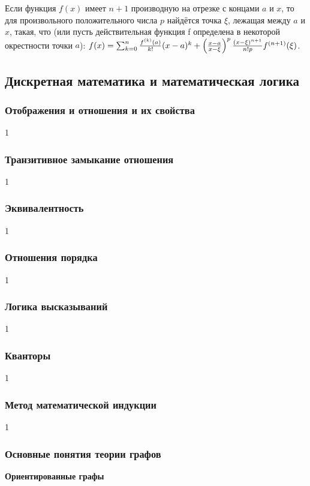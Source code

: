 \documentclass[12pt]{matmex-diploma}
\begin{document}
            Если функция $f(x)$ имеет $n+1$ производную на отрезке с концами $a$ и $x$, то для произвольного положительного числа $p$ найдётся точка $\xi$, лежащая между $a$ и $x$, такая, что (или пусть действительная функция f определена в некоторой окрестности точки $a$): 
            $f(x) = \sum_{k=0}^n {{f^{(k)}(a)} \over k!}(x-a)^k + {\left({x-a} \over {x - \xi}\right)^p {(x- \xi)^{n+1} \over n!p}f^{(n+1)}(\xi)}$.
        
    \subsection{Дискретная математика и математическая логика}
    
        \subsubsection*{Отображения и отношения и их свойства}
            1
        \subsubsection*{Транзитивное замыкание отношения}
            1
        \subsubsection*{Эквивалентность}
            1
        \subsubsection*{Отношения порядка}
            1
        \subsubsection*{Логика высказываний}
            1
        \subsubsection*{Кванторы}
            1
        \subsubsection*{Метод математической индукции}
            1
        \subsubsection*{Основные понятия теории графов}
        
            \textbf{Ориентированные графы}
            
\end{document}
